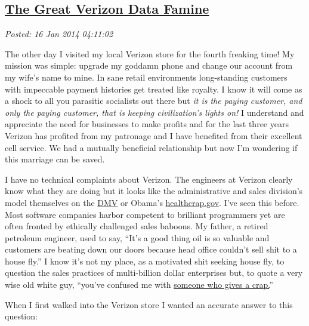 %

\subsection*{\href{http://bakerjd99.wordpress.com/2014/01/15/the-great-verizon-data-famine/}{The Great Verizon Data Famine}}


\noindent\emph{Posted: 16 Jan 2014 04:11:02}
\vspace{6pt}

The other day I visited my local Verizon store for the fourth freaking
time! My mission was simple: upgrade my goddamn phone and change our
account from my wife's name to mine. In sane retail environments
long-standing customers with impeccable payment histories get treated
like royalty. I know it will come as a shock to all you parasitic
socialists out there but \emph{it is the paying customer, and only the
paying customer, that is keeping civilization's lights on!} I understand
and appreciate the need for businesses to make profits and for the last
three years Verizon has profited from my patronage and I have benefited
from their excellent cell service. We had a mutually beneficial
relationship but now I'm wondering if this marriage can be saved.

I have no technical complaints about Verizon. The engineers at Verizon
clearly know what they are doing but it looks like the administrative
and sales division's model themselves on the
\href{http://www.urbandictionary.com/define.php?term=DMV}{DMV} or
Obama's \href{http://obamacaregov.us/}{healthcrap.gov}. I've seen this
before. Most software companies harbor competent to brilliant
programmers yet are often fronted by ethically challenged sales baboons.
My father, a retired petroleum engineer, used to say, ``It's a good
thing oil is so valuable and customers are beating down our doors
because head office couldn't sell shit to a house fly.'' I know it's not
my place, as a motivated shit seeking house fly, to question the sales
practices of multi-billion dollar enterprises but, to quote a very wise
old white guy, ``you've confused me with
\href{http://www.urbandictionary.com/define.php?term=call\%20someone\%20who\%20gives\%20a\%20shit}{someone
who gives a crap.}''

\medskip

When I first walked into the Verizon store I wanted an accurate answer
to this question:

\medskip

